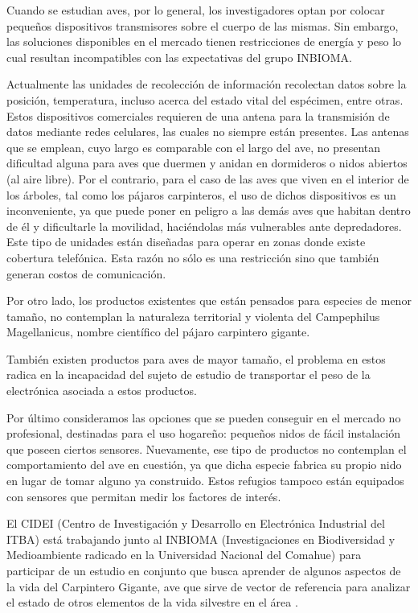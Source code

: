 %

%


Cuando se estudian aves, por lo general, los investigadores optan por colocar pequeños dispositivos transmisores sobre el cuerpo de las mismas. Sin embargo, las soluciones disponibles en el mercado tienen restricciones de energía y peso lo cual resultan incompatibles con las expectativas del grupo INBIOMA.

Actualmente las unidades de recolección de información recolectan datos sobre la posición, temperatura, incluso acerca del estado vital del espécimen, entre otras. Estos dispositivos comerciales requieren de una antena para la transmisión de datos mediante redes celulares, las cuales no siempre están presentes. Las antenas que se emplean, cuyo largo es comparable con el largo del ave, no presentan dificultad alguna para aves que duermen y anidan en dormideros o nidos abiertos (al aire libre). Por el contrario, para el caso de las aves que viven en el interior de los árboles, tal como los pájaros carpinteros, el uso de dichos dispositivos es un inconveniente, ya que puede poner en peligro a las demás aves que habitan dentro de él y dificultarle la movilidad, haciéndolas más vulnerables ante depredadores. Este tipo de unidades están diseñadas para operar en zonas donde existe cobertura telefónica. Esta razón no sólo es una restricción sino que también generan costos de comunicación.

Por otro lado, los productos existentes que están pensados para especies de menor tamaño, no contemplan la naturaleza territorial y violenta del Campephilus Magellanicus, nombre científico del pájaro carpintero gigante.

También existen productos para aves de mayor tamaño, el problema en estos radica en la incapacidad del sujeto de estudio de transportar el peso de la electrónica asociada a estos productos.

Por último consideramos las opciones que se pueden conseguir en el mercado no profesional, destinadas para el uso hogareño: pequeños nidos de fácil instalación que poseen ciertos sensores. Nuevamente, ese tipo de productos no contemplan el comportamiento del ave en cuestión, ya que dicha especie fabrica su propio nido en lugar de tomar alguno ya construido. Estos refugios tampoco están equipados con sensores que permitan medir los factores de interés. 


El CIDEI (Centro de Investigación y Desarrollo en Electrónica Industrial del ITBA) está trabajando junto al INBIOMA (Investigaciones en Biodiversidad y Medioambiente radicado en la Universidad Nacional del Comahue) para participar de un estudio en conjunto que busca aprender de algunos aspectos de la vida del Carpintero Gigante, ave que sirve de vector de referencia para analizar el estado de otros elementos de la vida silvestre en el área \cite{ref:PaperValeriaOjeda}.

